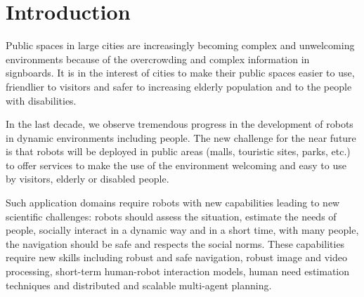 \section{Introduction}

Public spaces in large cities are increasingly becoming complex and unwelcoming environments because of the overcrowding and complex information in signboards. It is in the interest of cities to make their public spaces easier to use, friendlier to visitors and safer to increasing elderly population and to the people with disabilities.

In the last decade, we observe tremendous progress in the development of robots in dynamic environments %
including people. The new challenge for the near future is that robots will be deployed in public areas (malls, touristic sites, parks, etc.) to offer services to make the use of the environment welcoming and easy to use by visitors, elderly or disabled people. 

Such application domains require robots with new capabilities leading to new scientific challenges: robots should assess the situation, estimate the needs of people, socially interact in a dynamic way and in a short time, with many people, the navigation should be safe and respects the social norms. These capabilities require new skills including robust and safe navigation, robust image and video processing, short-term human-robot interaction models, human need estimation techniques and distributed and scalable multi-agent planning.


